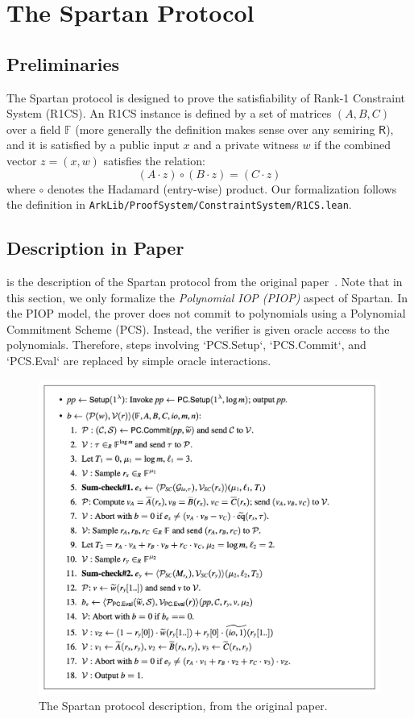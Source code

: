 \section{The Spartan Protocol}\label{sec:spartan}

\subsection{Preliminaries}

The Spartan protocol is designed to prove the satisfiability of Rank-1 Constraint System (R1CS).
An R1CS instance is defined by a set of matrices $(A, B, C)$ over a field $\mathbb{F}$ (more generally the definition makes sense over any semiring $\mathsf{R}$), and it is satisfied by a public input $x$ and a private witness $w$ if the combined vector $z = (x, w)$ satisfies the relation:
\[ (A \cdot z) \circ (B \cdot z) = (C \cdot z) \]
where $\circ$ denotes the Hadamard (entry-wise) product.
Our formalization follows the definition in \texttt{ArkLib/ProofSystem/ConstraintSystem/R1CS.lean}.

\subsection{Description in Paper}

 is the description of the Spartan protocol from the original
paper~\cite{spartan}. Note that in this section, we only formalize the \emph{Polynomial IOP (PIOP)}
aspect of Spartan. In the PIOP model, the prover does not commit to polynomials using a Polynomial
Commitment Scheme (PCS). Instead, the verifier is given oracle access to the polynomials. Therefore,
steps involving `PCS.Setup`, `PCS.Commit`, and `PCS.Eval` are replaced by simple oracle interactions.

\begin{figure}[ht]
    \centering
    \includegraphics{figures/spartan-description.png}
    \caption{The Spartan protocol description, from the original paper.}
    \label{fig:spartan_protocol}
\end{figure}

